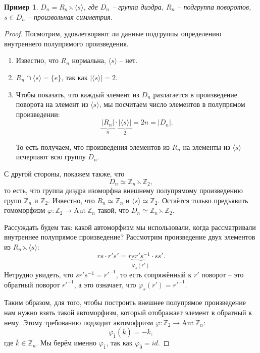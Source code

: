 \documentclass{article}
\newtheorem{example}{Пример}[section]
\begin{document}
\begin{example}
    $D_n = R_n \leftthreetimes \langle s \rangle$, где $D_n$ -- группа диэдра, $R_n$ -- подгруппа поворотов, $s \in D_n$ -- произвольная симметрия.
\end{example}
\begin{proof}
    Посмотрим, удовлетворяют ли данные подгруппы определению внутреннего полупрямого произведения.
    \begin{enumerate}
        \item Известно, что $R_n$ нормальна, $\langle s \rangle$ -- нет.
        \item $R_n \cap \langle s \rangle = \{ e \}$, так как $|\langle s \rangle| = 2$.
        \item Чтобы показать, что каждый элемент из $D_n$ разлагается в произведение поворота на элемент из $\langle s \rangle$, мы посчитаем число элементов в полупрямом произведении: $$ \underbrace{|R_n|}_{n} \cdot \underbrace{|\langle s \rangle|}_{2} = 2n = |D_n|. $$
        
        То есть получаем, что произведения элементов из $R_n$ на элементы из $\langle s \rangle$ исчерпают всю группу $D_n$.
    \end{enumerate}

    С другой стороны, покажем также, что $$ D_n \simeq \mathbb{Z}_n \leftthreetimes \mathbb{Z}_2, $$ то есть, что группа диэдра изоморфна внешнему полупрямому произведению групп $\mathbb{Z}_n$ и $\mathbb{Z}_2$. Известно, что $R_n \simeq \mathbb{Z}_n$ и $\langle s \rangle \simeq \mathbb{Z}_2$. Остаётся только предъявить гомоморфизм $\varphi: \mathbb{Z}_2 \rightarrow \mathrm{Aut} \ \mathbb{Z}_n$ такой, что  $ D_n \simeq \mathbb{Z}_n \leftthreetimes \mathbb{Z}_2$.

    Рассуждать будем так: какой автоморфизм мы использовали, когда рассматривали внутреннее полупрямое произведение? Рассмотрим произведение двух элементов из $ R_n \leftthreetimes \langle s \rangle $:
    $$ rs \cdot r' s' = r \underbrace{s r' s^{-1}}_{\varphi_s(r')} \cdot s s'. $$ Нетрудно увидеть, что $s r' s^{-1} = {r'}^{-1}$, то есть сопряжённый к $r'$ поворот -- это обратный поворот ${r'}^{-1}$, а это означает, что $\varphi_s(r') = {r'}^{-1}$.

    Таким образом, для того, чтобы построить внешнее полупрямое произведение нам нужно взять такой автоморфизм, который отображает элемент в обратный к нему. Этому требованию подходит автомофризм $\varphi: \mathbb{Z}_2 \rightarrow \mathrm{Aut} \ \mathbb{Z}_n$: 
    $$ \varphi_{\bar{1}} (\bar{k}) = - \bar{k}, $$ где $\bar{k} \in \mathbb{Z}_n$. Мы берём именно $\varphi_{\bar{1}}$, так как $\varphi_{\bar{0}} = id$.
\end{proof}
\end{document}
